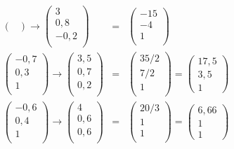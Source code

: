 \documentclass[11pt]{article}
\begin{document}
\begin{enumerate}
\begin{eqnarray*}
\begin{pmatrix}
\end{pmatrix}
\rightarrow
\begin{pmatrix}
3 \\ 0,8 \\ -0,2 \\
\end{pmatrix}
&=&
\begin{pmatrix}
-15 \\ -4 \\ 1 \\
\end{pmatrix}\\
\begin{pmatrix}
-0,7 \\ 0,3 \\ 1 \\
\end{pmatrix}
\rightarrow
\begin{pmatrix}
3,5 \\ 0,7 \\ 0,2 \\
\end{pmatrix}
&=&
\begin{pmatrix}
35/2 \\ 7/2 \\ 1 \\
\end{pmatrix}
=
\begin{pmatrix}
17,5 \\ 3,5 \\ 1
\end{pmatrix}\\
\begin{pmatrix}
-0,6 \\ 0,4 \\ 1 \\
\end{pmatrix}
\rightarrow
\begin{pmatrix}
4 \\ 0,6 \\ 0,6 \\
\end{pmatrix}
&=&
\begin{pmatrix}
20/3 \\ 1 \\ 1 \\
\end{pmatrix}
=
\begin{pmatrix}
6,66 \\ 1 \\ 1
\end{pmatrix}\\

\end{eqnarray*}
\end{enumerate}
\end{document}
